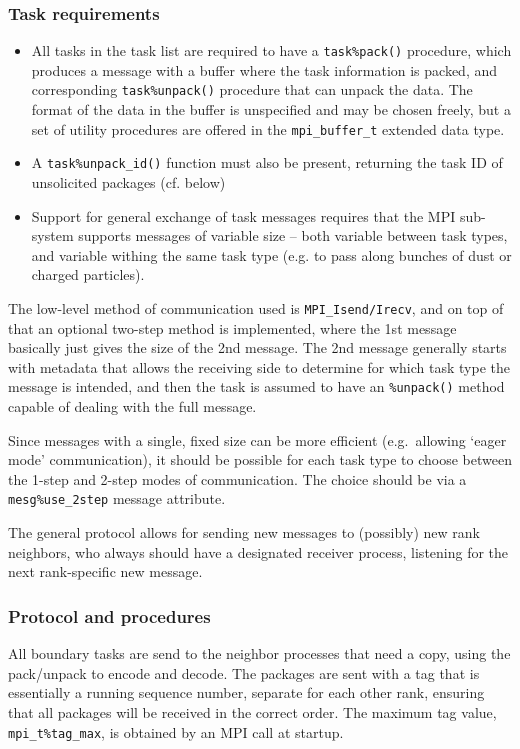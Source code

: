 \documentclass[paper=a4,fontsize=11pt]{scrartcl}
\numberwithin{equation}{section}		%
\numberwithin{figure}{section}			%
\numberwithin{table}{section}				%
\newcommand{\codecolor}{\color{Blue}}
\newcommand{\Code}[1]{{\codecolor\texttt{#1}}}
\begin{document}
\subsubsection{Task requirements}
\begin{itemize}
    \item All tasks in the task list are required to have a \Code{task\%pack()} procedure, which produces a message with a buffer where the task information is packed, and corresponding \Code{task\%unpack()} procedure that can unpack the data.  The format of the data in the buffer is unspecified and may be chosen freely, but a set of utility procedures are offered in the \Code{mpi\_buffer\_t} extended data type.
    \item A \Code{task\%unpack\_id()} function must also be present, returning the task ID of unsolicited packages (cf. below)
    \item Support for general exchange of task messages requires that the MPI sub-system supports messages of variable size -- both variable between task types, and variable withing the same task type (e.g. to pass along bunches of dust or charged particles).
\end{itemize}
The low-level method of communication used is \verb:MPI_Isend/Irecv:, and on top of that an optional two-step method is implemented, where the 1st message basically just gives the size of the 2nd message.  The 2nd message generally starts with metadata that allows the receiving side to determine for which task type the message is intended, and then the task is assumed to have an \verb:%unpack(): method capable of dealing with the full message.

Since messages with a single, fixed size can be more efficient (e.g.\ allowing `eager mode' communication), it should be possible for each task type to choose between the 1-step and 2-step modes of communication.  The choice should be via a \verb:mesg%use_2step: message attribute.

The general protocol allows for sending new messages to (possibly) new rank neighbors, who always should have a designated receiver process, listening for the next rank-specific new message.

\subsubsection{Protocol and procedures}
All boundary tasks are send to the neighbor processes that need a copy, using the pack/unpack to encode and decode.  The packages are sent with a tag that is essentially a running sequence number, separate for each other rank, ensuring that all packages will be received in the correct order.  The maximum tag value, \Code{mpi\_t\%tag\_max}, is obtained by an MPI call at startup.
\end{document}
